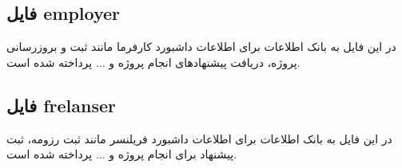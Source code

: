 \subsection{فایل employer}
در این فایل به بانک اطلاعات برای اطلاعات داشبورد کارفرما مانند ثبت و بروزرسانی پروژه، دریافت پیشنهادهای انجام پروژه و ... پرداخته شده است.

\subsection{فایل frelanser}
در این فایل به بانک اطلاعات برای ‌اطلاعات داشبورد فریلنسر مانند ثبت رزومه، ثبت پیشنهاد برای انجام پروژه و ... پرداخته شده است.
